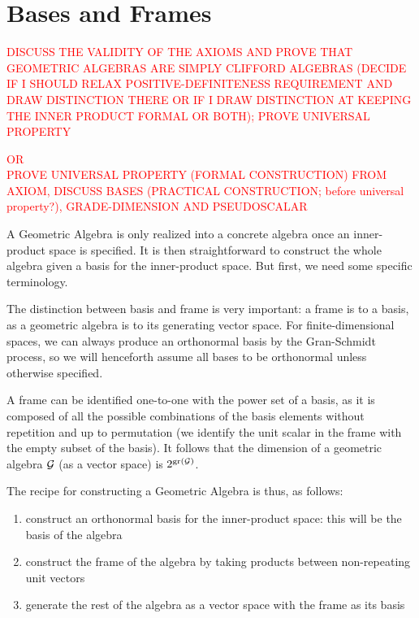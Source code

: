 \newpage

\section{Bases and Frames}

\textcolor{red}{DISCUSS THE VALIDITY OF THE AXIOMS AND PROVE THAT GEOMETRIC ALGEBRAS ARE SIMPLY CLIFFORD ALGEBRAS (DECIDE IF I SHOULD RELAX POSITIVE-DEFINITENESS REQUIREMENT AND DRAW DISTINCTION THERE OR IF I DRAW DISTINCTION AT KEEPING THE INNER PRODUCT FORMAL OR BOTH); PROVE UNIVERSAL PROPERTY}

\textcolor{red}{OR \\ PROVE UNIVERSAL PROPERTY (FORMAL CONSTRUCTION) FROM AXIOM, DISCUSS BASES (PRACTICAL CONSTRUCTION; before universal property?), GRADE-DIMENSION AND PSEUDOSCALAR}

A Geometric Algebra is only realized into a concrete algebra once an inner-product space is specified. It is then straightforward to construct the whole algebra given a basis for the inner-product space. But first, we need some specific terminology.





The distinction between basis and frame is very important: a frame is to a basis, as a geometric algebra is to its generating vector space.
For finite-dimensional spaces, we can always produce an orthonormal basis by the Gran-Schmidt process, so we will henceforth assume all bases to be orthonormal unless otherwise specified.

A frame can be identified one-to-one with the power set of a basis, as it is composed of all the possible combinations of the basis elements without repetition and up to permutation (we identify the unit scalar in the frame with the empty subset of the basis). It follows that the dimension of a geometric algebra $\mathcal{G}$ (as a vector space) is $2^{\mathrm{gr}\left(\mathcal{G}\right)}$.

The recipe for constructing a Geometric Algebra is thus, as follows:
\begin{enumerate}
	\item construct an orthonormal basis for the inner-product space: this will be the basis of the algebra
	\item construct the frame of the algebra by taking products between non-repeating unit vectors
	\item generate the rest of the algebra as a vector space with the frame as its basis
\end{enumerate}

% 
% 
